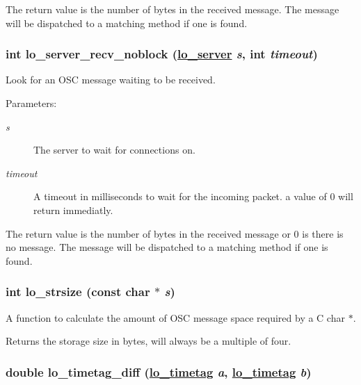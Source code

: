 The return value is the number of bytes in the received message. The message will be dispatched to a matching method if one is found. \hypertarget{group__liblolowlevel_g784a257252d05cc0e7210f4691f0661b}{
\subsubsection[lo\_\-server\_\-recv\_\-noblock]{\setlength{\rightskip}{0pt plus 5cm}int lo\_\-server\_\-recv\_\-noblock (\hyperlink{lo__types_8h_59067bf50cf8abb4371da6f03c9036c9}{lo\_\-server} {\em s}, int {\em timeout})}}
\label{group__liblolowlevel_g784a257252d05cc0e7210f4691f0661b}


Look for an OSC message waiting to be received. 

\begin{Desc}
\item[Parameters:]
\begin{description}
\item[{\em s}]The server to wait for connections on. \item[{\em timeout}]A timeout in milliseconds to wait for the incoming packet. a value of 0 will return immediatly.\end{description}
\end{Desc}
The return value is the number of bytes in the received message or 0 is there is no message. The message will be dispatched to a matching method if one is found. \hypertarget{group__liblolowlevel_ge62aa870bad161e4507f6338820ac243}{
\subsubsection[lo\_\-strsize]{\setlength{\rightskip}{0pt plus 5cm}int lo\_\-strsize (const char $\ast$ {\em s})}}
\label{group__liblolowlevel_ge62aa870bad161e4507f6338820ac243}


A function to calculate the amount of OSC message space required by a C char $\ast$. 

Returns the storage size in bytes, will always be a multiple of four. \hypertarget{group__liblolowlevel_g9937fce1bfce695b01cd3289ead8b919}{
\subsubsection[lo\_\-timetag\_\-diff]{\setlength{\rightskip}{0pt plus 5cm}double lo\_\-timetag\_\-diff (\hyperlink{structlo__timetag}{lo\_\-timetag} {\em a}, \hyperlink{structlo__timetag}{lo\_\-timetag} {\em b})}}
\label{group__liblolowlevel_g9937fce1bfce695b01cd3289ead8b919}


